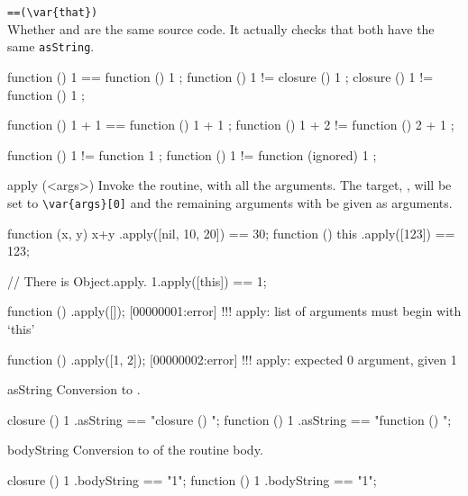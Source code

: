 \begin{urbiscriptapi}
\item \lstinline|==(\var{that})|\\
  Whether \this and  are the same source code.
  It actually checks that both have the same \lstinline|asString|.
\begin{urbiassert}
function () { 1 } == function () { 1 };
function () { 1 } != closure  () { 1 };
closure  () { 1 } != function () { 1 };

function () { 1 + 1 } == function () { 1 + 1 };
function () { 1 + 2 } != function () { 2 + 1 };

function () { 1 } != function { 1 };
function () { 1 } != function (ignored) { 1 };
\end{urbiassert}

\item[apply](<args>)%
  Invoke the routine, with all the arguments.  The target,
  \this, will be set to \lstinline|\var{args}[0]| and the
  remaining arguments with be given as arguments.
\begin{urbiassert}
function (x, y) { x+y }.apply([nil, 10, 20]) == 30;
function () { this }.apply([123]) == 123;

// There is Object.apply.
1.apply([this]) == 1;
\end{urbiassert}
\begin{urbiscript}
function () {}.apply([]);
[00000001:error] !!! apply: list of arguments must begin with `this'

function () {}.apply([1, 2]);
[00000002:error] !!! apply: expected 0 argument, given 1
\end{urbiscript}

\item[asString]
  Conversion to .
\begin{urbiassert}
closure  () { 1 }.asString == "closure () {\n}";
function () { 1 }.asString == "function () {\n}";
\end{urbiassert}

\item[bodyString]
  Conversion to  of the routine body.
\begin{urbiassert}
closure  () { 1 }.bodyString == "1";
function () { 1 }.bodyString == "1";
\end{urbiassert}

\end{urbiscriptapi}

